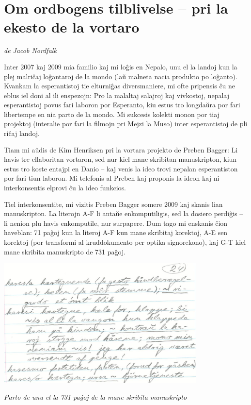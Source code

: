\pagestyle{plain}

\setlength{\textheight}{7.0in}
\setlength{\parskip}{1.5ex plus 0.2ex minus 0.2ex}
\setlength{\parindent}{0cm}
\titlespacing{\section}{0pt}{10pt}{0pt}

\section{Om ordbogens tilblivelse -- pri la ekesto de la vortaro}
{\itshape
de Jacob Nordfalk}

{\frenchspacing
Inter 2007 kaj 2009 mia familio kaj mi lo\^gis en Nepalo, unu el la
landoj kun la plej malri\^caj lo\^gantaroj de la mondo (la\u{u} malneta
nacia produkto po lo\^ganto). Kvankam la esperantistoj tie elturni\^gas
diversmaniere, mi ofte pripensis \^cu ne eblus iel doni al ili
enspezojn: Pro la malaltaj salajroj kaj vivkostoj, nepalaj
esperantistoj povus fari laboron por Esperanto, kiu estus tro
longda\u{u}ra por fari libertempe en nia parto de la mondo. Mi sukcesis
kolekti monon por tiaj projektoj (interalie por fari la filmojn pri
Mejzi la Muso) inter esperantistoj de pli ri\^caj landoj.}

{\frenchspacing
Tiam mi a\u{u}dis de Kim Henriksen pri la vortara projekto de Preben
Bagger: Li havis tre ellaboritan vortaron, sed nur kiel mane skribitan
manuskripton, kiun estus tro koste entajpi en Danio -- kaj venis la
ideo trovi nepalan esperantiston por fari tiun laboron. Mi telefonis al
Preben kaj proponis la ideon kaj ni interkonsentis elprovi \^cu la ideo
funkcios.

Tiel interkonsentite, mi vizitis Preben Bagger somere 2009 kaj skanis
lian manuskripton. La literojn A-F li anta\u{u}e enkomputiligis, sed la
dosiero perdi\^gis -- li nenion plu havis enkomputile, nur surpapere.
Dum tago mi enskanis \^cion haveblan: 71 pa\^goj kun la literoj A-F kun
mane skribitaj korektoj, A-E sen korektoj (por transformi al
kruddokumento per optika signorekono), kaj G-T kiel mane skribita
manuskripto de 731 pa\^goj. }

\begin{center}
	\includegraphics[width=10.5cm]{origino.png}
	
	{\frenchspacing\itshape
	Parto de unu el la 731 pa\^goj de la mane skribita manuskripto}
	
\end{center}


